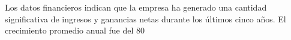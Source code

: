 
                Los datos financieros indican que la empresa ha generado una cantidad significativa de ingresos y ganancias netas durante los últimos cinco años. El crecimiento promedio anual fue del 80%
